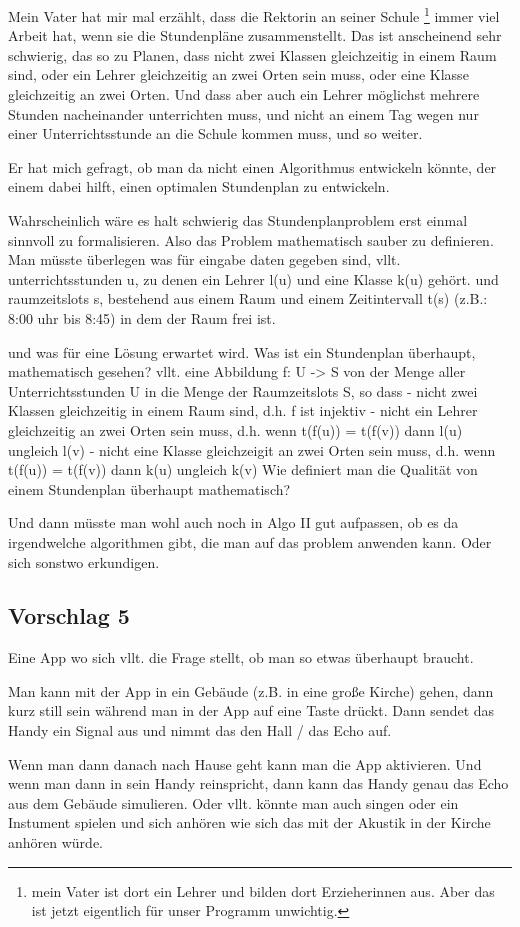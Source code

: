Mein Vater hat mir mal erzählt, dass die Rektorin an seiner Schule \footnote{mein Vater ist dort ein Lehrer und bilden dort Erzieherinnen aus. Aber das ist jetzt eigentlich für unser Programm unwichtig.} immer viel Arbeit hat, wenn sie die Stundenpläne zusammenstellt. Das ist anscheinend sehr schwierig, das so zu Planen, dass nicht zwei Klassen gleichzeitig in einem Raum sind, oder ein Lehrer gleichzeitig an zwei Orten sein muss, oder eine Klasse gleichzeitig an zwei Orten. Und dass aber auch ein Lehrer möglichst mehrere Stunden nacheinander unterrichten muss, und nicht an einem Tag wegen nur einer Unterrichtsstunde an die Schule kommen muss, und so weiter.

Er hat mich gefragt, ob man da nicht einen Algorithmus entwickeln könnte, der einem dabei hilft, einen optimalen Stundenplan zu entwickeln.

Wahrscheinlich wäre es halt schwierig das Stundenplanproblem erst einmal sinnvoll zu formalisieren. Also das Problem mathematisch sauber zu definieren. Man müsste überlegen 
was für eingabe daten gegeben sind, 
	vllt. unterrichtsstunden u, zu denen ein Lehrer l(u) und eine Klasse k(u) gehört.
	und raumzeitslots s, bestehend aus einem Raum und einem Zeitintervall t(s) (z.B.: 8:00 uhr bis 8:45) in dem der Raum frei ist.

und was für eine Lösung erwartet wird. 
Was ist ein Stundenplan überhaupt, mathematisch gesehen?
	vllt. eine  Abbildung f: U -> S von der Menge aller Unterrichtsstunden U in die Menge der Raumzeitslots S, so dass
	- nicht zwei Klassen gleichzeitig in einem Raum sind, d.h. f ist injektiv
	- nicht ein Lehrer gleichzeitig an zwei Orten sein muss, d.h. wenn t(f(u)) = t(f(v)) dann l(u) ungleich l(v) 
	- nicht eine Klasse gleichzeigit an zwei Orten sein muss, d.h. wenn t(f(u)) = t(f(v)) dann k(u) ungleich k(v) 		
Wie definiert man die Qualität von einem Stundenplan überhaupt mathematisch?

Und dann müsste man wohl auch noch in Algo II gut aufpassen, ob es da irgendwelche algorithmen gibt, die man auf das problem anwenden kann. Oder sich sonstwo erkundigen.

\subsection{Vorschlag 5}

Eine App wo sich vllt. die Frage stellt, ob man so etwas überhaupt braucht.

Man kann mit der App in ein Gebäude (z.B. in eine große Kirche) gehen, dann kurz still sein während man in der App auf eine Taste drückt. Dann sendet das Handy ein Signal aus und nimmt das den Hall / das Echo auf.

Wenn man dann danach nach Hause geht kann man die App aktivieren. Und wenn man dann in sein Handy reinspricht, dann kann das Handy genau das Echo aus dem Gebäude simulieren. Oder vllt. könnte man auch singen oder ein Instument spielen und sich anhören wie sich das mit der Akustik in der Kirche anhören würde. 

